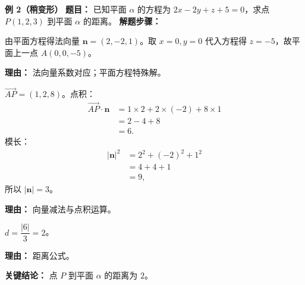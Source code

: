 \begin{examplebox}
	\medskip
	\textbf{\textcolor{CExample}{例 2（稍变形）}}
	\textbf{\textcolor{CExample}{题目：}}
	已知平面 $\alpha$ 的方程为 $2x-2y+z+5=0$，求点 $P(1,2,3)$ 到平面 $\alpha$ 的距离。
	\textbf{\textcolor{CExample}{解题步骤：}}
	\begin{description}[style=nextline, leftmargin=2.8em, labelsep=0.5em, itemsep=0.45em]
		\item[\textbf{第一步（确定法向量与平面上一点）：}]
			由平面方程得法向量 $\mathbf{n}=(2,-2,1)$。取 $x=0,y=0$ 代入方程得 $z=-5$，故平面上一点 $A(0,0,-5)$。
			\par\textbf{理由：} 法向量系数对应；平面方程特殊解。
		\item[\textbf{第二步（计算 $\vec{AP}$ 与点积）：}]
			$\vec{AP}=(1,2,8)$。点积：
			\[
				\begin{aligned}
					\vec{AP}\cdot\mathbf{n} &= 1\times2+2\times(-2)+8\times1 \\&= 2-4+8 \\&= 6.
			\end{aligned}
			\]
			模长：
			\[
				\begin{aligned}
					|\mathbf{n}|^2 &= 2^2+(-2)^2+1^2 \\&= 4+4+1 \\&= 9,
			\end{aligned}
			\]
			所以 $|\mathbf{n}|=3$。
			\par\textbf{理由：} 向量减法与点积运算。
		\item[\textbf{第三步（代入公式求距离）：}]
			$d=\dfrac{|6|}{3}=2$。
			\par\textbf{理由：} 距离公式。
	\end{description}
	\textbf{\textcolor{CExample}{关键结论：}}
	点 $P$ 到平面 $\alpha$ 的距离为 \textbf{$2$}。


\end{examplebox}
